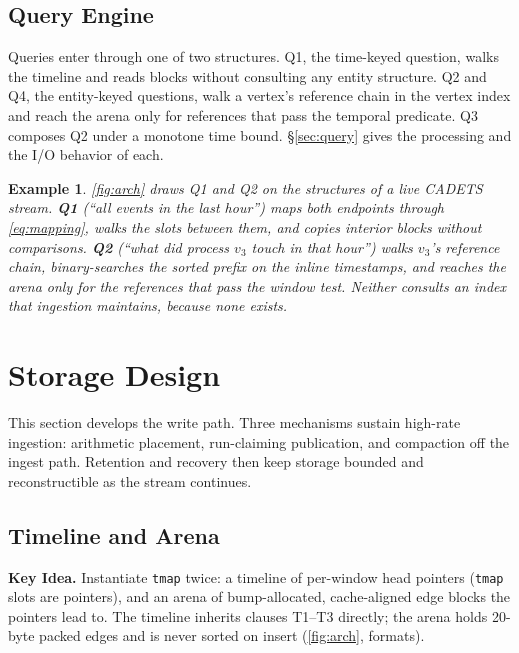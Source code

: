 \documentclass[sigconf,nonacm]{acmart}
\newcommand{\tmap}{\texttt{tmap}\xspace}
\newtheorem{example}{Example}
\begin{document}
\subsection{Query Engine}\label{sec:overview-query}
Queries enter through one of two structures. Q1, the time-keyed
question, walks the timeline and reads blocks without consulting any
entity structure. Q2 and Q4, the entity-keyed questions, walk a
vertex's reference chain in the vertex index and reach the arena only
for references that pass the temporal predicate. Q3 composes Q2 under
a monotone time bound. \S\ref{sec:query} gives the processing and the
I/O behavior of each.



\begin{example}\label{ex:queries}
\cref{fig:arch} draws Q1 and Q2 on the structures of a live CADETS
stream. \textcolor{qwin}{\textbf{Q1}} (``all events in the last
hour'') maps both endpoints through \cref{eq:mapping}, walks the slots
between them, and copies interior blocks without comparisons.
\textcolor{qnbr}{\textbf{Q2}} (``what did process $v_3$ touch in that
hour'') walks $v_3$'s reference chain, binary-searches the sorted
prefix on the inline timestamps, and reaches the arena only for the
references that pass the window test. Neither consults an index that
ingestion maintains, because none exists.
\end{example}

\section{Storage Design}\label{sec:storage}
This section develops the write path. Three mechanisms sustain high-rate ingestion: arithmetic
placement, run-claiming publication, and compaction off the ingest
path. Retention and recovery then keep
storage bounded and reconstructible as the stream continues.

\subsection{Timeline and Arena}\label{sec:storage-tl}
\textbf{Key Idea.} Instantiate \tmap twice: a timeline of per-window
head pointers (\tmap slots are pointers), and an arena of
bump-allocated, cache-aligned edge blocks the pointers lead to. The
timeline inherits clauses T1--T3 directly; the arena holds 20-byte
packed edges and is never sorted on insert (\cref{fig:arch}, formats).
\end{document}
